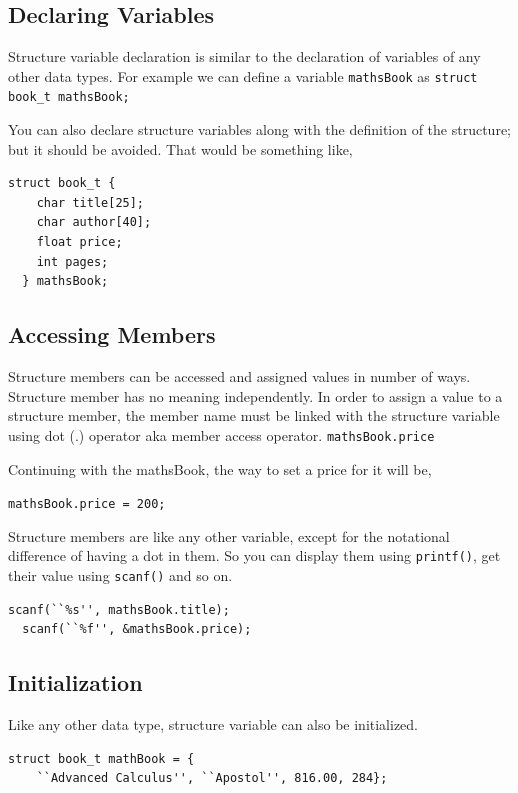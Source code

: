 \documentclass[11pt,a4paper]{article}
\begin{document}
\subsection*{Declaring  Variables}
Structure variable declaration is similar to the declaration of variables of any other data types. For example we can define a variable \texttt{mathsBook} as \lstinline!struct book_t mathsBook;!

You can also declare structure variables along with the definition of the structure; but it should be avoided. That would be something like,
\begin{lstlisting}[numbers=none]
  struct book_t {
    char title[25];
    char author[40];
    float price;
    int pages;
  } mathsBook;
\end{lstlisting}

\subsection*{Accessing Members}
Structure members can be accessed and assigned values in number of ways. Structure member has no meaning independently. In order to assign a value to a structure member, the member name must be linked with the structure variable using dot (.) operator aka member access operator. \texttt{mathsBook.price}

Continuing with the mathsBook, the way to set a price for it will be, 

\texttt{mathsBook.price = 200;} 

Structure members are like any other variable, except for the notational difference of having a dot in them. So you can display them using \texttt{printf()}, get their value using \texttt{scanf()} and so on.

\begin{lstlisting}[numbers=none]
  scanf(``%s'', mathsBook.title);
  scanf(``%f'', &mathsBook.price);
\end{lstlisting}

\subsection*{Initialization}
Like any other data type, structure variable can also be initialized.

\begin{lstlisting}[numbers=none]
  struct book_t mathBook = {
    ``Advanced Calculus'', ``Apostol'', 816.00, 284}; 
\end{lstlisting}
\end{document}
